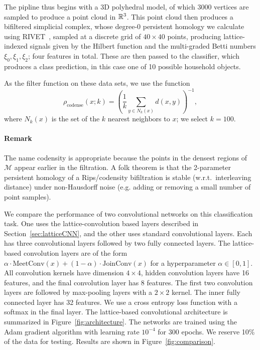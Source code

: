 \documentclass{article}
\begin{document}
The pipline thus begins with a 3D polyhedral model, of which $3000$ vertices are
sampled to produce a point cloud in $\mathbb{R}^3$. This point cloud then produces a
bifiltered simplicial complex, whose degree-$0$ persistent homology we calculate
using RIVET~\cite{lesnick_interactive_2015}, sampled at a discrete grid of $40
\times 40$ points, producing lattice-indexed signals given by the Hilbert
function and the multi-graded Betti numbers $\xi_0, \xi_1, \xi_2$; four features
in total. These are then passed to the classifier, which produces a class
prediction, in this case one of 10 possible household objects.

As the filter function on these data sets, we use the  function \[\rho_{\text{codense}}(x;k) = \left( \frac{1}{k} \sum_{y \in N_k(x)} d(x,y) \right)^{-1},\]
where $N_k(x)$ is the set of the $k$ nearest neighbors to $x$; we select
$k=100$.
\paragraph{Remark}
The name codensity is appropriate because the points in the densest
regions of $\mathcal M$ appear earlier in the filtration. A folk theorem is that
the 2-parameter persistent homology of a Rips/codensity bifiltration is stable (w.r.t.~interleaving distance)
under non-Hausdorff noise (e.g. adding or removing a small number of point samples).

We compare the performance of two convolutional networks on this classification
task. One uses the lattice-convolution based layers described in
Section~\ref{sec:latticeCNN}, and the other uses standard convolutional layers.
Each has three convolutional layers followed by two fully connected layers.
The lattice-based convolution layers are of the form $\alpha \cdot \text{MeetConv}(x) +
(1-\alpha)\cdot\text{JoinConv}(x)$ for a hyperparameter $\alpha \in [0,1]$. All
convolution kernels have dimension $4 \times 4$, hidden convolution layers have
16 features, and the final convolution layer has 8 features. The first two convolution
layers are followed by max-pooling layers with a $2 \times 2$ kernel.
The inner fully connected layer has 32 features. We use a cross entropy loss
function with a softmax in the final layer. The lattice-based convolutional architecture
is summarized in Figure~\ref{fig:architecture}.
The networks are trained using the
Adam gradient algorithm with learning rate $10^{-4}$ for 300 epochs. We reserve
10\% of the data for testing. Results are shown in Figure~\ref{fig:comparison}.
\end{document}
